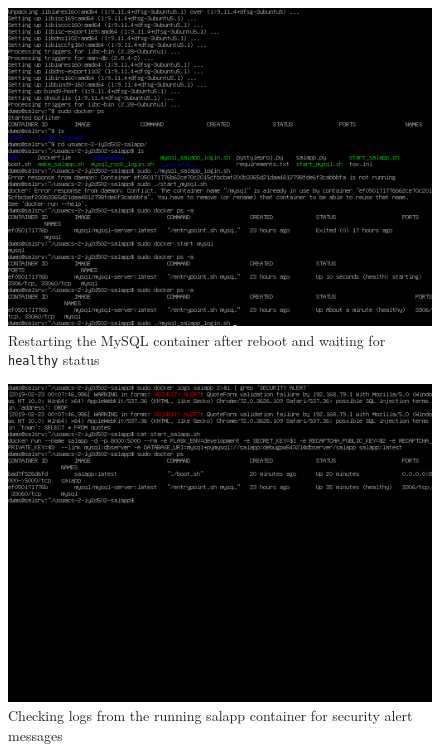 \pagebreak
\begin{figure}[h!]
\centering
\captionsetup{skip=\skipfigurecaptionlen}
\includegraphics[width=1\textwidth]{screenshots/IY2D502-2019-02-22-23-49-29.png}
\caption{Restarting the MySQL container after reboot and waiting for \texttt{healthy} status}
\label{fig:IY2D502-2019-02-22-23-49-29}
\end{figure}
\pagebreak
\begin{figure}[h!]
\centering
\captionsetup{skip=\skipfigurecaptionlen}
\includegraphics[width=1\textwidth]{screenshots/IY2D502-2019-02-23-00-23-12.png}
\caption{Checking logs from the running salapp container for security alert messages}
\label{fig:IY2D502-2019-02-23-00-23-12}
\end{figure}
\pagebreak
